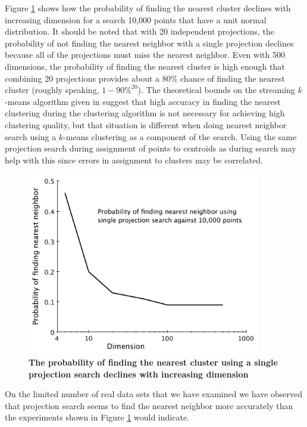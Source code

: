 \documentclass[11pt]{amsart}
\begin{document}
Figure \ref{projection-probability} shows how the probability of finding the nearest cluster declines with increasing dimension for a search 10,000 points that have a unit normal distribution.  It should be noted that with 20 independent projections, the probability of not finding the nearest neighbor with a single projection declines because all of the projections must miss the nearest neighbor.  Even with 500 dimensions, the probability of finding the nearest cluster is high enough that combining 20 projections provides about a 80\% chance of finding the nearest cluster (roughly speaking, $ 1-90\%^{20}$).    The theoretical bounds on the streaming $k$-means algorithm given in \cite{DBLP:conf/nips/ShindlerWM11} suggest that high accuracy in finding the nearest clustering during the clustering algorithm is not necessary for achieving high clustering quality, but that situation is different when doing nearest neighbor search using a $k$-means clustering as a component of the search.  Using the same projection search during assignment of points to centroids as during search may help with this since errors in assignment to clusters may be correlated.
\begin{figure}[htbp]
\begin{center}
\includegraphics[width=4in]{projection-probability.pdf}
\caption{{\bf The probability of finding the nearest cluster using a single projection search declines with increasing dimension}}
\label{projection-probability}
\end{center}
\end{figure}
On the limited number of real data sets that we have examined we have observed that projection search seems to find the nearest neighbor more accurately than the experiments shown in Figure \ref{projection-probability} would indicate.
\end{document}
